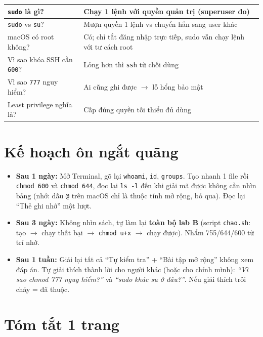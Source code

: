 \documentclass[12pt,a4paper]{article}
\newcommand{\cmd}[1]{\texttt{#1}}
\begin{document}
\begin{longtable}{|>{\raggedright\arraybackslash}p{6cm}|>{\raggedright\arraybackslash}p{7.5cm}|}
\hline
\cmd{sudo} là gì? & Chạy 1 lệnh với quyền quản trị (superuser do) \\
\hline
\cmd{sudo} vs \cmd{su}? & Mượn quyền 1 lệnh vs chuyển hẳn sang user khác \\
\hline
macOS có root không? & Có; chỉ tắt đăng nhập trực tiếp, sudo vẫn chạy lệnh với tư
cách root \\
\hline
Vì sao khóa SSH cần \cmd{600}? & Lỏng hơn thì \cmd{ssh} từ chối dùng \\
\hline
Vì sao \cmd{777} nguy hiểm? & Ai cũng ghi được $\rightarrow$ lỗ hổng bảo mật \\
\hline
Least privilege nghĩa là? & Cấp đúng quyền tối thiểu đủ dùng \\
\hline
\end{longtable}

\section{Kế hoạch ôn ngắt quãng}

\begin{itemize}
\item \textbf{Sau 1 ngày:} Mở Terminal, gõ lại \cmd{whoami}, \cmd{id}, \cmd{groups}.
  Tạo nhanh 1 file rồi \cmd{chmod 600} và \cmd{chmod 644}, đọc lại \cmd{ls -l} đến
  khi giải mã được không cần nhìn bảng (nhớ: dấu \cmd{@} trên macOS chỉ là thuộc tính
  mở rộng, bỏ qua). Đọc lại ``Thẻ ghi nhớ'' một lượt.
\item \textbf{Sau 3 ngày:} Không nhìn sách, tự làm lại \textbf{toàn bộ lab B} (script
  \cmd{chao.sh}: tạo $\rightarrow$ chạy thất bại $\rightarrow$ \cmd{chmod u+x} $\rightarrow$ chạy được). Nhẩm 755/644/600
  từ trí nhớ.
\item \textbf{Sau 1 tuần:} Giải lại tất cả ``Tự kiểm tra'' + ``Bài tập mở rộng''
  không xem đáp án. Tự giải thích thành lời cho người khác (hoặc cho chính mình):
  \textit{``Vì sao chmod 777 nguy hiểm?''} và \textit{``sudo khác su ở đâu?''}. Nếu
  giải thích trôi chảy = đã thuộc.
\end{itemize}

\section{Tóm tắt 1 trang}
\end{document}

